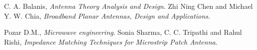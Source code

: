 \documentclass[twoside,twocolumn]{article}
\begin{document}
\renewcommand{\refname}{Bibliografia}

\begin{thebibliography}{99} %

 C. A. Balanis, \emph
{Antenna Theory Analysis and Design}.
 Zhi Ning Chen and Michael Y. W. Chia, \emph
{Broadband Planar Antennas, Design and Applications}.

 Pozar D.M., \emph
{Microwave engineering}.
 Sonia Sharma, C. C. Tripathi and Rahul Rishi, \emph
{Impedance Matching Techniques for Microstrip
Patch Antenna}.
\end{thebibliography}

\end{document}
